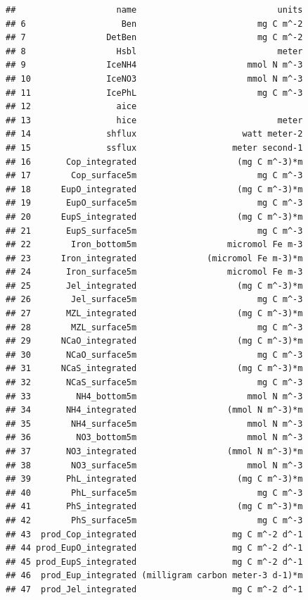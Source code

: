 \documentclass[
]{article}
\begin{document}
\begin{verbatim}
##                    name                            units
## 6                   Ben                        mg C m^-2
## 7                DetBen                        mg C m^-2
## 8                  Hsbl                            meter
## 9                IceNH4                      mmol N m^-3
## 10               IceNO3                      mmol N m^-3
## 11               IcePhL                        mg C m^-3
## 12                 aice                                 
## 13                 hice                            meter
## 14               shflux                     watt meter-2
## 15               ssflux                   meter second-1
## 16       Cop_integrated                    (mg C m^-3)*m
## 17        Cop_surface5m                        mg C m^-3
## 18      EupO_integrated                    (mg C m^-3)*m
## 19       EupO_surface5m                        mg C m^-3
## 20      EupS_integrated                    (mg C m^-3)*m
## 21       EupS_surface5m                        mg C m^-3
## 22        Iron_bottom5m                  micromol Fe m-3
## 23      Iron_integrated              (micromol Fe m-3)*m
## 24       Iron_surface5m                  micromol Fe m-3
## 25       Jel_integrated                    (mg C m^-3)*m
## 26        Jel_surface5m                        mg C m^-3
## 27       MZL_integrated                    (mg C m^-3)*m
## 28        MZL_surface5m                        mg C m^-3
## 29      NCaO_integrated                    (mg C m^-3)*m
## 30       NCaO_surface5m                        mg C m^-3
## 31      NCaS_integrated                    (mg C m^-3)*m
## 32       NCaS_surface5m                        mg C m^-3
## 33         NH4_bottom5m                      mmol N m^-3
## 34       NH4_integrated                  (mmol N m^-3)*m
## 35        NH4_surface5m                      mmol N m^-3
## 36         NO3_bottom5m                      mmol N m^-3
## 37       NO3_integrated                  (mmol N m^-3)*m
## 38        NO3_surface5m                      mmol N m^-3
## 39       PhL_integrated                    (mg C m^-3)*m
## 40        PhL_surface5m                        mg C m^-3
## 41       PhS_integrated                    (mg C m^-3)*m
## 42        PhS_surface5m                        mg C m^-3
## 43  prod_Cop_integrated                   mg C m^-2 d^-1
## 44 prod_EupO_integrated                   mg C m^-2 d^-1
## 45 prod_EupS_integrated                   mg C m^-2 d^-1
## 46  prod_Eup_integrated (milligram carbon meter-3 d-1)*m
## 47  prod_Jel_integrated                   mg C m^-2 d^-1

\end{verbatim}
\end{document}
